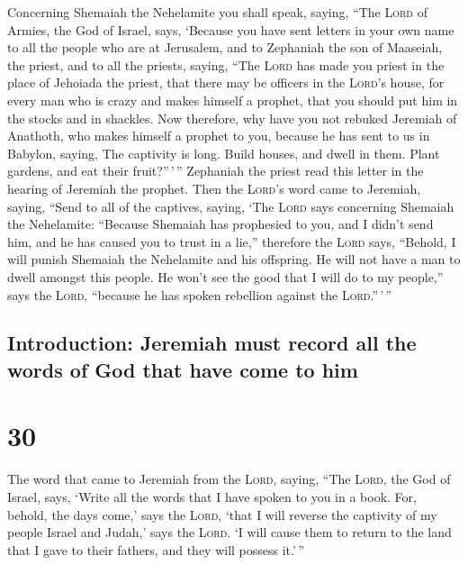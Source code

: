  Concerning Shemaiah the Nehelamite you shall speak,
saying,  ``The \textsc{Lord} of Armies, the God of
Israel, says, `Because you have sent letters in your own name to all the
people who are at Jerusalem, and to Zephaniah the son of Maaseiah, the
priest, and to all the priests, saying,  ``The
\textsc{Lord} has made you priest in the place of Jehoiada the priest,
that there may be officers in the \textsc{Lord}'s house, for every man
who is crazy and makes himself a prophet, that you should put him in the
stocks and in shackles.  Now therefore, why have you not
rebuked Jeremiah of Anathoth, who makes himself a prophet to you,
 because he has sent to us in Babylon, saying, The
captivity is long. Build houses, and dwell in them. Plant gardens, and
eat their fruit?''\,'\,''  Zephaniah the priest read this
letter in the hearing of Jeremiah the prophet.  Then the
\textsc{Lord}'s word came to Jeremiah, saying,  ``Send to
all of the captives, saying, `The \textsc{Lord} says concerning Shemaiah
the Nehelamite: ``Because Shemaiah has prophesied to you, and I didn't
send him, and he has caused you to trust in a lie,'' 
therefore the \textsc{Lord} says, ``Behold, I will punish Shemaiah the
Nehelamite and his offspring. He will not have a man to dwell amongst
this people. He won't see the good that I will do to my people,'' says
the \textsc{Lord}, ``because he has spoken rebellion against the
\textsc{Lord}.''\,'\,''

\hypertarget{introduction-jeremiah-must-record-all-the-words-of-god-that-have-come-to-him}{%
\subsection{Introduction: Jeremiah must record all the words of God that
have come to
him}\label{introduction-jeremiah-must-record-all-the-words-of-god-that-have-come-to-him}}

\hypertarget{section-29}{%
\section{30}\label{section-29}}

 The word that came to Jeremiah from the \textsc{Lord},
saying,  ``The \textsc{Lord}, the God of Israel, says,
`Write all the words that I have spoken to you in a book. 
For, behold, the days come,' says the \textsc{Lord}, `that I will
reverse the captivity of my people Israel and Judah,' says the
\textsc{Lord}. `I will cause them to return to the land that I gave to
their fathers, and they will possess it.'\,''

